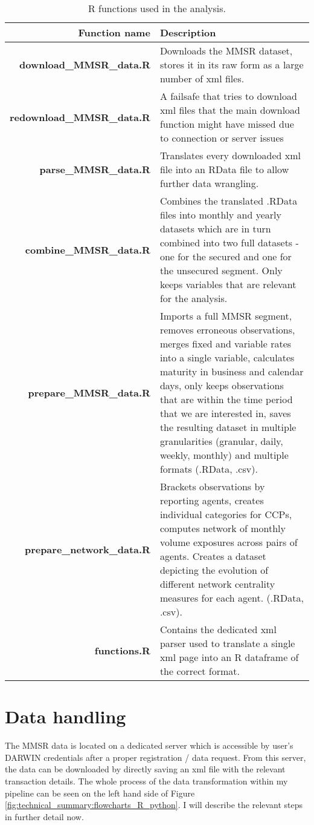 \begin{table}[h]
	\centering
	\begin{tabularx}{0.9\linewidth}{rX}
		Function name & Description \\
		\toprule
		\textbf{download\_MMSR\_data.R} & Downloads the MMSR dataset, stores it in its raw form as a large number of xml files. \\
		\textbf{redownload\_MMSR\_data.R} & A failsafe that tries to download xml files that the main download function might have missed due to connection or server issues \\
		\textbf{parse\_MMSR\_data.R} & Translates every downloaded xml file into an RData file to allow further data wrangling.  \\
		\textbf{combine\_MMSR\_data.R} & Combines the translated .RData files into monthly and yearly datasets which are in turn combined into two full datasets - one for the secured and one for the unsecured segment. Only keeps variables that are relevant for the analysis.   \\
		\textbf{prepare\_MMSR\_data.R} & Imports a full MMSR segment, removes erroneous observations, merges fixed and variable rates into a single variable, calculates maturity in business and calendar days, only keeps observations that are within the time period that we are interested in, saves the resulting dataset in multiple granularities (granular, daily, weekly, monthly) and multiple formats (.RData, .csv).\\
		\textbf{prepare\_network\_data.R} & Brackets observations by reporting agents, creates individual categories for CCPs, computes network of monthly volume exposures across pairs of agents. Creates a dataset depicting the evolution of different network centrality measures for each agent. (.RData, .csv).\\
		\textbf{functions.R} & Contains the dedicated xml parser used to translate a single xml page into an R dataframe of the correct format. \\
		\bottomrule
	\end{tabularx}
	\caption{R functions used in the analysis.}
	\label{tab:technical_summary:used_functions_R}
\end{table}

\section{Data handling}
The MMSR data is located on a dedicated server which is accessible by user's DARWIN credentials after a proper registration / data request. From this server, the data can be downloaded by directly saving an xml file with the relevant transaction details. The whole process of the data transformation within my pipeline can be seen on the left hand side of Figure \ref{fig:technical_summary:flowcharts_R_python}. I will describe the relevant steps in further detail now.

